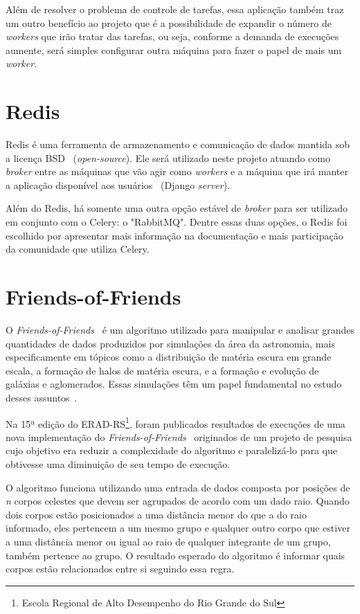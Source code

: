 \documentclass[tg]{mdtufsm}
\begin{document}
Além de resolver o problema de controle de tarefas, essa aplicação também traz um outro benefício ao projeto que é a possibilidade de expandir o número de \emph{workers} que irão tratar das tarefas, ou seja, conforme a demanda de execuções aumente, será simples configurar outra máquina para fazer o papel de mais um \emph{worker}.

\section{Redis}
Redis \cite{redis} é uma ferramenta de armazenamento e comunicação de dados mantida sob a licença BSD ~(\emph{open-source}). Ele será utilizado neste projeto atuando como \emph{broker} entre as máquinas que vão agir como \emph{workers} e a máquina que irá manter a aplicação disponível aos usuários ~(Django \emph{server}). 

Além do Redis, há somente uma outra opção estável de \emph{broker} para ser utilizado em conjunto com o Celery: o "RabbitMQ". Dentre essas duas opções, o Redis foi escolhido por apresentar mais informação na documentação e mais participação da comunidade que utiliza Celery.

\section{Friends-of-Friends}
O \emph{Friends-of-Friends}~\cite{friendsalg} é um algoritmo utilizado para manipular e analisar grandes quantidades de dados produzidos por simulações da área da astronomia, mais especificamente em tópicos como a distribuição de matéria escura em grande escala, a formação de halos de matéria escura, e a formação e evolução de galáxias e aglomerados. Essas simulações têm um papel fundamental no estudo desses assuntos~\cite{Bertschinger,Efstathiou}.

Na 15ª edição do ERAD-RS\footnote{Escola Regional de Alto Desempenho do Rio Grande do Sul}, foram publicados resultados de execuções de uma nova implementação do \emph{Friends-of-Friends}~\cite{friends} originados de um projeto de pesquisa cujo objetivo era reduzir a complexidade do algoritmo e paralelizá-lo para que obtivesse uma diminuição de seu tempo de execução.

O algoritmo funciona utilizando uma entrada de dados composta por posições de \emph{n} corpos celestes que devem ser agrupados de acordo com um dado raio. Quando dois corpos estão posicionados a uma distância menor do que a do raio informado, eles pertencem a um mesmo grupo e qualquer outro corpo que estiver a uma distância menor ou igual ao raio de qualquer integrante de um grupo, também pertence ao grupo. O resultado esperado do algoritmo é informar quais corpos estão relacionados entre si seguindo essa regra.
\end{document}

